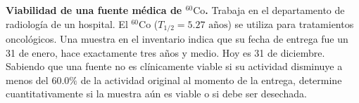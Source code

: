 \item \textbf{Viabilidad de una fuente médica de $^{60}\text{Co}$.}
Trabaja en el departamento de radiología de un hospital. El $^{60}\text{Co}$ ($T_{1/2} = 5.27\text{ años}$) se utiliza para tratamientos oncológicos. Una muestra en el inventario indica que su fecha de entrega fue un 31 de enero, hace exactamente tres años y medio. Hoy es 31 de diciembre. Sabiendo que una fuente no es clínicamente viable si su actividad disminuye a menos del $60.0\%$ de la actividad original al momento de la entrega, determine cuantitativamente si la muestra aún es viable o si debe ser desechada.